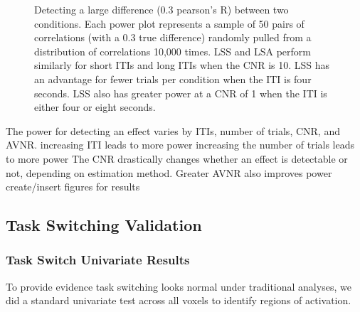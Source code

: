 \documentclass[10pt,letterpaper]{article}
\begin{document}
\begin{figure}[H]
  \centering
  \subfloat{}

  \subfloat{}
  \label{fig:dlarge}
\end{figure}

\begin{figure}[H]
  \ContinuedFloat
  \centering
  \subfloat{}

  \subfloat{}
  \caption{
    Detecting a large difference (0.3 pearson's R) between two conditions.
    Each power plot represents a sample of 50 pairs of correlations (with a 0.3 true difference)
    randomly pulled from a distribution of correlations 10,000 times.
    LSS and LSA perform similarly for short ITIs and long ITIs when the CNR is 10.
    LSS has an advantage for fewer trials per condition when the ITI is four seconds.
    LSS also has greater power at a CNR of 1 when the ITI is either four or
    eight seconds.
    }
  \label{fig:dlarge}
\end{figure}
The power for detecting an effect varies by ITIs, number of trials, CNR, and AVNR.
increasing ITI leads to more power
increasing the number of trials leads to more power
The CNR drastically changes whether an effect is detectable or not, depending on estimation method.
Greater AVNR also improves power
create/insert figures for results


\subsection*{Task Switching Validation}

\subsubsection{Task Switch Univariate Results}
To provide evidence task switching looks normal under traditional analyses,
we did a standard univariate test across all voxels to identify regions
of activation.

\begin{figure}[H]
  \centering
  \subfloat{
    
  }
  \label{fig:statmaps}
\end{figure}
\end{document}
